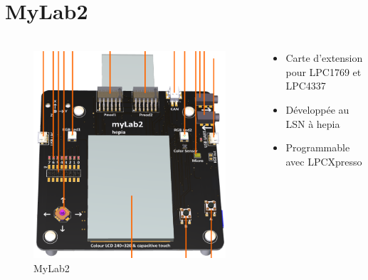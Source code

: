 \documentclass{beamer}
\begin{document}

\section{MyLab2}
\begin{frame}
	\frametitle{\secname}
  \begin{columns}[T]
		\begin{column}{.30\textwidth}
			\begin{figure}
				\includegraphics[width=1\textwidth]{images/mylab2.png}
				\caption{MyLab2}
			\end{figure}
		\end{column}
		\begin{column}{.70\textwidth}
			\begin{itemize}
				\item Carte d'extension pour LPC1769 et LPC4337
				\item Développée au LSN à hepia
				\item Programmable avec LPCXpresso
			\end{itemize}
		\end{column}
	\end{columns}
\end{frame}
\end{document}
